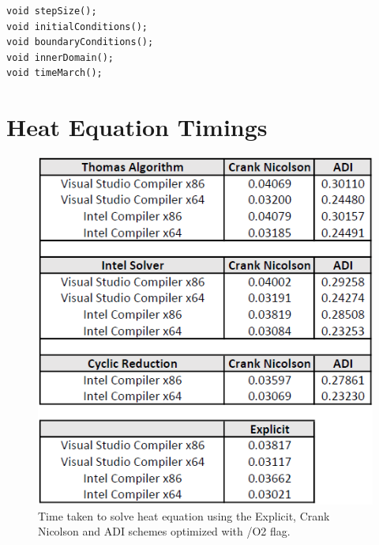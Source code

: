 \documentclass[12pt, oneside]{book}
\theoremstyle{plain}
\theoremstyle{definition}
\begin{document}
\begin{verbatim}
void stepSize();
void initialConditions();
void boundaryConditions();
void innerDomain();
void timeMarch();
\end{verbatim}

\chapter{Heat Equation Timings} \label{heatTime}
\begin{figure}[!htb]
    \centering
        \includegraphics[scale=0.6]{heat2Optimized.png}
    \caption{Time taken to solve heat equation using the Explicit, Crank Nicolson and ADI schemes  optimized with /O2 flag.}
\end{figure}
\end{document}
